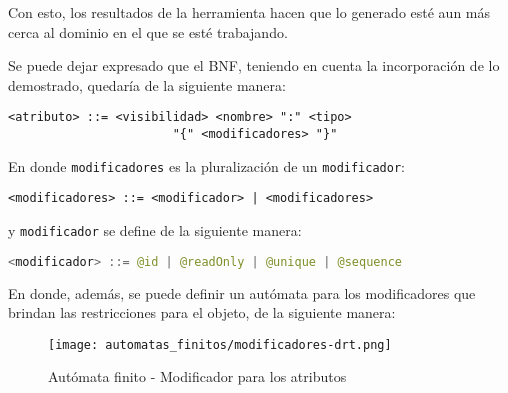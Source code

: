 Con esto, los resultados de la herramienta hacen que lo generado esté aun
más cerca al dominio en el que se esté trabajando.

Se puede dejar expresado que el BNF, teniendo en cuenta la incorporación de lo
demostrado, quedaría de la siguiente manera:

\begin{lstlisting}[caption={BNF - Atributo}, basicstyle=\ttfamily\footnotesize,
label=lst:bnf_atributo_restr]
		<atributo> ::= <visibilidad> <nombre> ":" <tipo>
		               "{" <modificadores> "}"
\end{lstlisting}

En donde \texttt{modificadores} es la pluralización de un \texttt{modificador}:

\begin{lstlisting}[basicstyle=\ttfamily\footnotesize]
	<modificadores> ::= <modificador> | <modificadores>
\end{lstlisting}

y \texttt{modificador} se define de la siguiente manera:

\begin{lstlisting}[language=Java, basicstyle=\footnotesize\ttfamily, label=lst:bnf_atributo_modif]
	<modificador> ::= @id | @readOnly | @unique | @sequence
\end{lstlisting}

En donde, además, se puede definir un autómata para los modificadores que
brindan las restricciones para el objeto, de la siguiente manera:

\begin{figure}[H]
	\centering
	\texttt{[image: automatas\_finitos/modificadores-drt.png]}
	\caption{Autómata finito - Modificador para los atributos}
	\label{fig:af_atr_modif_OCL}
\end{figure}
